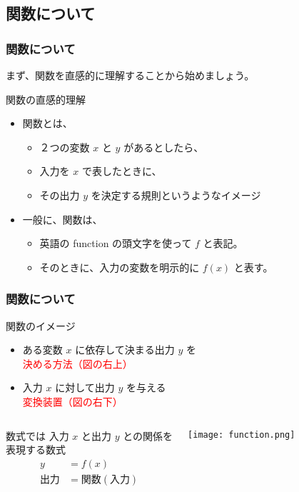 \documentclass[12pt, dvipdfmx]{beamer}
\begin{document}
\subsection{関数について}
\begin{frame}
	\frametitle{関数について}
		まず、関数を直感的に理解することから始めましょう。
		\begin{block}{関数の直感的理解}
			\begin{itemize}
				\item 関数とは、
				\begin{itemize}
					\item ２つの変数 $x$ と $y$ があるとしたら、
					\item 入力を $x$ で表したときに、
					\item その出力 $y$ を決定する規則というようなイメージ
				\end{itemize}
				\item 一般に、関数は、
				\begin{itemize}
					\item 英語の function の頭文字を使って $f$ と表記。
					\item そのときに、入力の変数を明示的に $f(x)$ と表す。
				\end{itemize}
			\end{itemize}
		\end{block}
\end{frame}

\begin{frame}
	\frametitle{関数について}
		\begin{block}{関数のイメージ}
			\begin{itemize}
				\item ある変数 $x$ に依存して決まる出力 $y$ を\\ 
				\textcolor{red}{決める方法（図の右上）}
				\item 入力 $x$ に対して出力 $y$ を与える\\
				\textcolor{red}{変換装置（図の右下）}
			\end{itemize}
		\end{block}
		\begin{columns}[T, onlytextwidth]
				\begin{exampleblock}{数式では}
					入力 $x$ と出力 $y$ との関係を\\表現する数式
				\begin{align*}
					y&=f(x) \\
					\text{出力}&=\text{関数} \left(\text{入力} \right)
				\end{align*}
				\end{exampleblock}
				\vspace{-5mm}
				\begin{center}
					\texttt{[image: function.png]}
				\end{center}
		\end{columns}
\end{frame}
\end{document}
